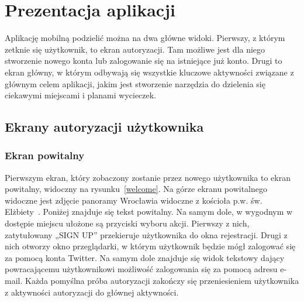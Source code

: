 \newpage
\section{Prezentacja aplikacji}
\vspace{1cm}
    Aplikację mobilną podzielić można na dwa główne widoki. Pierwszy, z którym zetknie się użytkownik, to ekran autoryzacji. Tam możliwe jest dla niego stworzenie nowego konta lub zalogowanie się
    na istniejące już konto. Drugi to ekran główny, w którym odbywają się wszystkie kluczowe aktywności związane z głównym celem aplikacji, jakim jest stworzenie narzędzia do dzielenia się 
    ciekawymi miejscami i planami wycieczek.

\vspace{1cm}
    \subsection{Ekrany autoryzacji użytkownika}
        \subsubsection{Ekran powitalny}
        Pierwszym ekran, który zobaczony zostanie przez nowego użytkownika to ekran powitalny, widoczny na rysunku~\ref{welcome}. Na górze ekranu powitalnego widoczne jest zdjęcie panoramy
        Wrocławia widoczne z kościoła p.w. św. Elżbiety~\cite{RYNEK}. Poniżej znajduje się tekst powitalny. Na samym dole, w wygodnym w dostępie miejscu ułożone są przyciski wyboru akcji.
        Pierwszy z nich, zatytułowany „SIGN UP” przekieruje użytkownika do okna rejestracji. Drugi z nich otworzy okno przeglądarki, w którym użytkownik będzie mógł zalogować się za pomocą
        konta Twitter. Na samym dole znajduje się widok tekstowy dający powracającemu użytkownikowi możliwość zalogowania się za pomocą adresu e-mail. Każda pomyślna próba autoryzacji
        zakończy się przeniesieniem użytkownika z aktywności autoryzacji do głównej aktywności.

